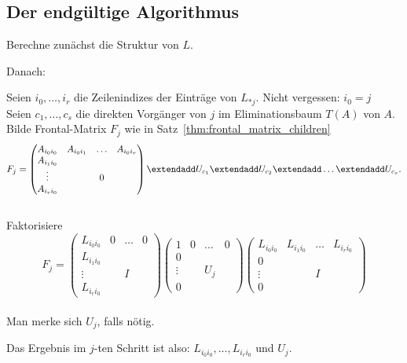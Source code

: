 
\subsection{Der endgültige Algorithmus}

Berechne zunächst die Struktur von $L$.

\medskip

Danach:

\medskip

\begin{algorithm}[H]
 \SetAlgoLined

 {
 Seien $i_0,\ldots,i_r$ die Zeilenindizes der Einträge von $L_{*j}$. Nicht vergessen: $i_0=j$
 \\
 Seien $c_1,\ldots,c_s$ die direkten Vorgänger von $j$ im Eliminationsbaum $T(A)$ von $A$.
 \\
 Bilde Frontal-Matrix $F_j$ wie in Satz~\ref{thm:frontal_matrix_children}
  \begin{equation*}
 F_j
 =
 \begin{pmatrix}
  A_{{i_0}{i_0}} & A_{{i_0}{i_1}} & \ldots & A_{{i_0}{i_r}} \\
  A_{{i_1}{i_0}} \\
  \vdots & & 0 \\
  A_{{i_r}{i_0}}
 \end{pmatrix} \extendadd U_{c_1} \extendadd U_{c_2} \extendadd \ldots \extendadd U_{c_s}.
\end{equation*}
 \\
 Faktorisiere
 \begin{equation*}
 F_j
 =
			\begin{pmatrix}
				L_{{i_0}{i_0}} & 0 & \ldots & 0 \\
				L_{{i_1}{i_0}} \\
				\vdots & & I \\
				L_{{i_r}{i_0}}
			\end{pmatrix}
 \begin{pmatrix}
				1 & 0 & \ldots & 0 \\
				0 \\
				\vdots & & U_j \\
				0
 \end{pmatrix}
 \begin{pmatrix}
				L_{{i_0}{i_0}} & L_{{i_1}{i_0}} & \ldots & L_{{i_r}{i_0}} \\
				0 \\
				\vdots & & I \\
				0
 \end{pmatrix}
 \end{equation*}
 \\
 Man merke sich $U_j$, falls nötig.
 }
\end{algorithm}
Das Ergebnis im $j$-ten Schritt ist also: $L_{i_0i_0},\ldots,L_{i_ri_0}$ und $U_j$.

